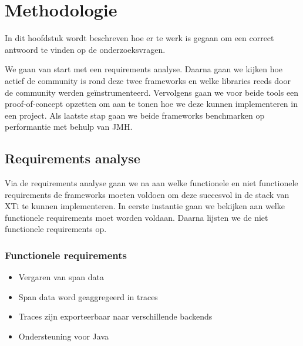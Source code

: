 
\chapter{Methodologie}
\label{ch:methodologie}


In dit hoofdstuk wordt beschreven hoe er te werk is gegaan om een correct antwoord te vinden op de onderzoeksvragen.

We gaan van start met een requirements analyse. Daarna gaan we kijken hoe actief de community is rond deze twee frameworks en welke libraries reeds door de community werden geïnstrumenteerd. Vervolgens gaan we voor beide tools een proof-of-concept opzetten om aan te tonen hoe we deze kunnen implementeren in een project. Als laatste stap gaan we beide frameworks benchmarken op performantie met behulp van \gls{JMH}.

\section{Requirements analyse}
Via de requirements analyse gaan we na aan welke functionele en niet functionele requirements de frameworks moeten voldoen om deze succesvol in de stack van XTi te kunnen implementeren. In eerste instantie gaan we bekijken aan welke functionele requirements moet worden voldaan. Daarna lijsten we de niet functionele requirements op.

\subsection{Functionele requirements}
\begin{itemize}
	\item Vergaren van span data
	\item Span data word geaggregeerd in traces
	\item Traces zijn exporteerbaar naar verschillende backends
	\item Ondersteuning voor Java
\end{itemize}

